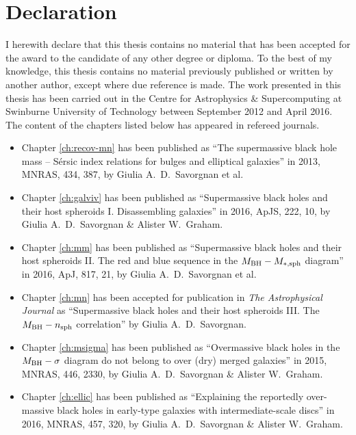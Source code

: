 \chapter*{Declaration}

I herewith declare that this thesis contains no material that has been accepted 
for the award to the candidate of any other degree or diploma. 
To the best of my knowledge, 
this thesis contains no material previously published or written by another author, 
except where due reference is made.
The work presented in this thesis has been carried out 
in the Centre for Astrophysics \& Supercomputing 
at Swinburne University of Technology between September 2012 and April 2016. 
The content of the chapters listed below has appeared in refereed journals. 

\begin{itemize}

\item Chapter \ref{ch:recov-mn} has been published as 
``The supermassive black hole mass -- S\'ersic index relations for bulges and elliptical galaxies''
in 2013, MNRAS, 434, 387, by Giulia A.~D.~Savorgnan et al.

\item Chapter \ref{ch:galviv} has been published as 
``Supermassive black holes and their host spheroids I. Disassembling galaxies'' 
in 2016, ApJS, 222, 10, by Giulia A.~D.~Savorgnan \& Alister W.~Graham. 

\item Chapter \ref{ch:mm} has been published as 
``Supermassive black holes and their host spheroids 
II. The red and blue sequence in the $M_{\rm BH} - M_{\rm *,sph}$ diagram''
in 2016, ApJ, 817, 21, by Giulia A.~D.~Savorgnan et al.

\item Chapter \ref{ch:mn} has been accepted for publication in \emph{The Astrophysical Journal} as 
``Supermassive black holes and their host spheroids 
III. The $M_{\rm BH} - n_{\rm sph}$ correlation''
by Giulia A.~D.~Savorgnan.

\item Chapter \ref{ch:msigma} has been published as 
``Overmassive black holes in the $M_{\rm BH} - \sigma$ diagram do not belong to over (dry) merged galaxies''
in 2015, MNRAS, 446, 2330, by Giulia A.~D.~Savorgnan \& Alister W.~Graham. 

\item Chapter \ref{ch:ellic} has been published as 
``Explaining the reportedly over-massive black holes in early-type galaxies with intermediate-scale discs'' 
in 2016, MNRAS, 457, 320, by Giulia A.~D.~Savorgnan \& Alister W.~Graham. 

\end{itemize}

